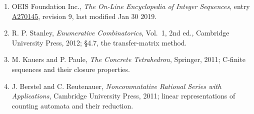 \documentclass[11pt]{article}
\theoremstyle{definition}
\begin{document}
\begin{enumerate}

\item OEIS Foundation Inc., \emph{The On-Line Encyclopedia of Integer Sequences}, entry \href{https://oeis.org/A270145}{A270145}, revision 9, last modified Jan 30 2019.

\item R. P. Stanley, \emph{Enumerative Combinatorics}, Vol.~1, 2nd ed., Cambridge University Press, 2012; \S4.7, the transfer-matrix method.

\item M. Kauers and P. Paule, \emph{The Concrete Tetrahedron}, Springer, 2011; C-finite sequences and their closure properties.

\item J. Berstel and C. Reutenauer, \emph{Noncommutative Rational Series with Applications}, Cambridge University Press, 2011; linear representations of counting automata and their reduction.

\end{enumerate}
\end{document}
